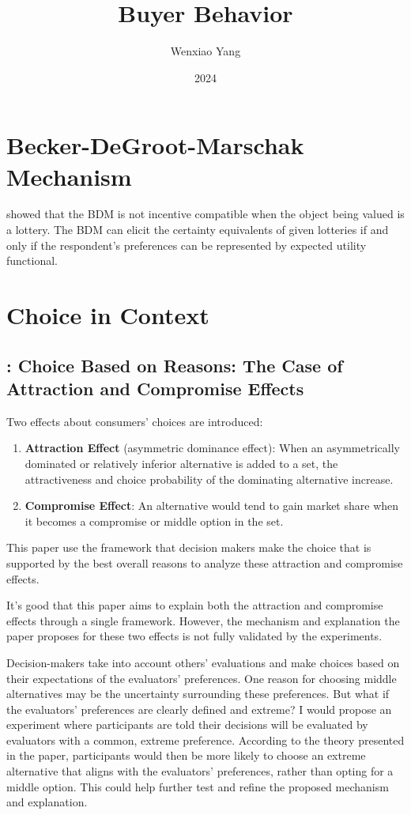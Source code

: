 \documentclass[11pt]{elegantbook}
\title{Buyer Behavior}
\author{Wenxiao Yang}
\institute{Haas School of Business, University of California Berkeley}
\date{2024}
\begin{document}
\maketitle

\frontmatter
\tableofcontents

\mainmatter



\chapter{Becker-DeGroot-Marschak Mechanism}
\cite{karni1987preference} showed that the BDM is not incentive compatible when the object being valued is a lottery. The BDM can elicit the certainty equivalents of given lotteries if and only if the respondent's preferences can be represented by expected utility functional.


\chapter{Choice in Context}
\section{\cite{simonson1989choice}: Choice Based on Reasons: The Case of Attraction and Compromise Effects}
Two effects about consumers' choices are introduced:
\begin{enumerate}
    \item \textbf{Attraction Effect} (asymmetric dominance effect): When an asymmetrically dominated or relatively inferior alternative is added to a set, the attractiveness and choice probability of the dominating alternative increase.
    \item \textbf{Compromise Effect}: An alternative would tend to gain market share when it becomes a compromise or middle option in the set.
\end{enumerate}
This paper use the framework that decision makers make the choice that is supported by the best overall reasons to analyze these attraction and compromise effects.

It’s good that this paper aims to explain both the attraction and compromise effects through a single framework. However, the mechanism and explanation the paper proposes for these two effects is not fully validated by the experiments.

Decision-makers take into account others’ evaluations and make choices based on their expectations of the evaluators’ preferences. One reason for choosing middle alternatives may be the uncertainty surrounding these preferences. But what if the evaluators’ preferences are clearly defined and extreme? I would propose an experiment where participants are told their decisions will be evaluated by evaluators with a common, extreme preference. According to the theory presented in the paper, participants would then be more likely to choose an extreme alternative that aligns with the evaluators’ preferences, rather than opting for a middle option. This could help further test and refine the proposed mechanism and explanation.
\end{document}
